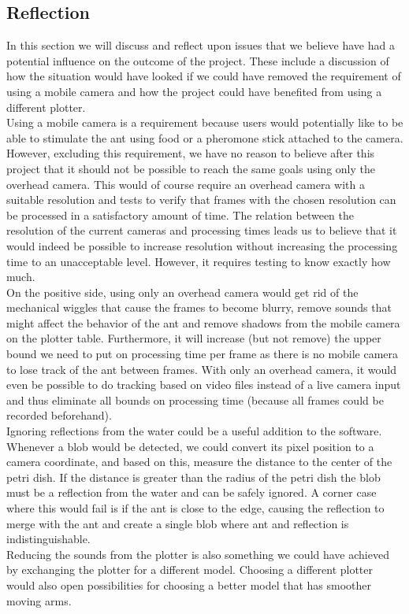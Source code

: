 
\subsection{Reflection}
In this section we will discuss and reflect upon issues that we believe have had a potential influence on the outcome of the project. These include a discussion of how the situation would have looked if we could have removed the requirement of using a mobile camera and how the project could have benefited from using a different plotter. \\

Using a mobile camera is a requirement because users would potentially like to be able to stimulate the ant using food or a pheromone stick attached to the camera. However, excluding this requirement, we have no reason to believe after this project that it should not be possible to reach the same goals using only the overhead camera. This would of course require an overhead camera with a suitable resolution and tests to verify that frames with the chosen resolution can be processed in a satisfactory amount of time. The relation between the resolution of the current cameras and processing times leads us to believe that it would indeed be possible to increase resolution without increasing the processing time to an unacceptable level. However, it requires testing to know exactly how much. \\

On the positive side, using only an overhead camera would get rid of the mechanical wiggles that cause the frames to become blurry, remove sounds that might affect the behavior of the ant and remove shadows from the mobile camera on the plotter table. Furthermore, it will increase (but not remove) the upper bound we need to put on processing time per frame as there is no mobile camera to lose track of the ant between frames. With only an overhead camera, it would even be possible to do tracking based on   video files instead of a live camera input and thus eliminate all bounds on processing time (because all frames could be recorded beforehand). \\

Ignoring reflections from the water could be a useful addition to the software. Whenever a blob would be detected, we could convert its pixel position to a camera coordinate, and based on this, measure the distance to the center of the petri dish. If the distance is greater than the radius of the petri dish the blob must be a reflection from the water and can be safely ignored. A corner case where this would fail is if the ant is close to the edge, causing the reflection to merge with the ant and create a single blob where ant and reflection is indistinguishable.\\

Reducing the sounds from the plotter is also something we could have achieved by exchanging the plotter for a different model. Choosing a different plotter would also open possibilities for choosing a better model that has smoother moving arms.